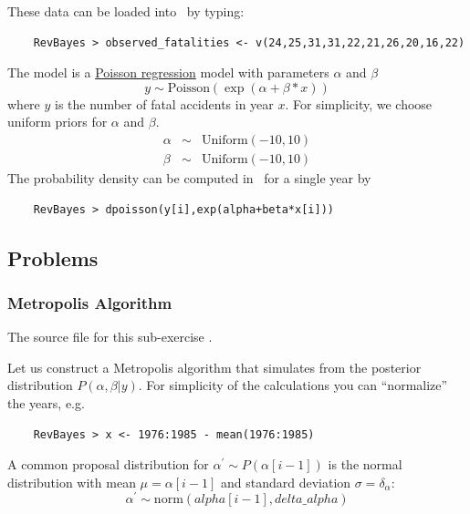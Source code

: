 These data can be loaded into \RevBayes~by typing:
{\tt \begin{snugshade*}
\begin{lstlisting}    
    RevBayes > observed_fatalities <- v(24,25,31,31,22,21,26,20,16,22)
\end{lstlisting}
\end{snugshade*}}

The model is a \href{http://en.wikipedia.org/wiki/Poisson_regression}{Poisson regression} model with parameters $\alpha$ and $\beta$
\begin{equation*}
y \sim \text{Poisson}(\exp(\alpha+\beta*x))
\end{equation*} 
where $y$ is the number of fatal accidents in year $x$. 
For simplicity, we choose uniform priors for $\alpha$ and $\beta$.
\begin{eqnarray*}
\alpha & \sim & \text{Uniform}(-10,10)\\
\beta &  \sim & \text{Uniform}(-10,10)
\end{eqnarray*}
The probability density can be computed in \RevBayes~for a single year by
{\tt \begin{snugshade*}
\begin{lstlisting}    
    RevBayes > dpoisson(y[i],exp(alpha+beta*x[i]))
\end{lstlisting}
\end{snugshade*}}

\subsection*{Problems}

\subsubsection*{Metropolis Algorithm}%

The source file for this sub-exercise .

Let us construct a Metropolis algorithm that simulates from the posterior distribution $P(\alpha,\beta|y)$. 
For simplicity of the calculations you can ``normalize'' the years, e.g. 
{\tt \begin{snugshade*}
\begin{lstlisting}    
    RevBayes > x <- 1976:1985 - mean(1976:1985)
\end{lstlisting}
\end{snugshade*}}

A common proposal distribution for $\alpha^{\prime} \sim P(\alpha[i-1])$ is the normal distribution with mean $\mu = \alpha[i-1]$ and standard deviation $\sigma = \delta_\alpha$:
\begin{equation}
\alpha^{\prime} \sim \text{norm}(alpha[i-1],delta\_alpha)
\end{equation}

